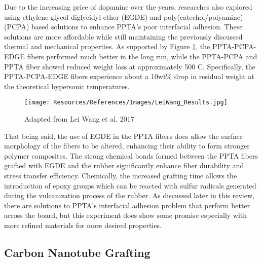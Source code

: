 \documentclass[12pt]{article}
\begin{document}
\begin{multicols}{2}
\indent Due to the increasing price of dopamine over the years, researches also explored using ethylene glycol diglycidyl ether (EGDE) and poly(catechol/polyamine) (PCPA) based solutions to enhance PPTA's poor interfacial adhesion. \citep{LeiWang2017} These solutions are more affordable while still maintaining the previously discussed thermal and mechanical properties. As supported by Figure \ref{fig:LeiWang_Results}, the PPTA-PCPA-EDGE fibers performed much better in the long run, while the PPTA-PCPA and PPTA fiber showed reduced weight loss at approximately 500 \degree C. Specifically, the PPTA-PCPA-EDGE fibers experience about a 10wt\% drop in residual weight at the theoretical hypersonic temperatures.

\begin{figure}[H]
    \centering
    \texttt{[image: Resources/References/Images/LeiWang\_Results.jpg]}
    \caption{\scriptsize{Adapted from Lei Wang et al. 2017 \citep{LeiWang2017}}}
    \label{fig:LeiWang_Results}
\end{figure}

\indent That being said, the use of EGDE in the PPTA fibers does allow the surface morphology of the fibers to be altered, enhancing their ability to form stronger polymer composites. The strong chemical bonds formed between the PPTA fibers grafted with EGDE and the rubber significantly enhance fiber durability and stress transfer efficiency. \citep{LeiWang2017} Chemically, the increased grafting time allows the introduction of epoxy groups which can be reacted with sulfur radicals generated during the vulcanization process of the rubber. \citep{Zhang2012} As discussed later in this review, there are solutions to PPTA's interfacial adhesion problem that perform better across the board, but this experiment does show some promise especially with more refined materials for more desired properties.

\subsection{Carbon Nanotube Grafting}


\end{multicols}
\end{document}
